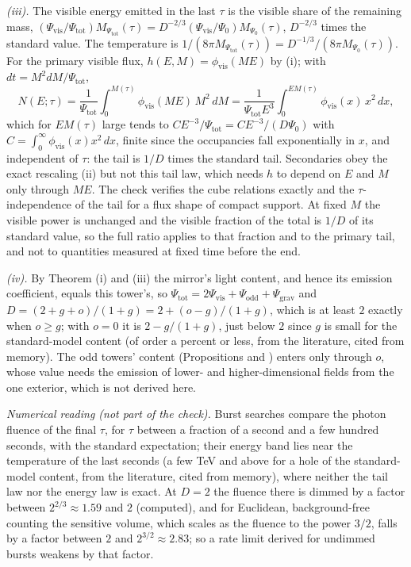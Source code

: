 \emph{(iii).} The visible energy emitted in the last $\tau$ is the visible share of the remaining mass, $(\Psi_{\mathrm{vis}}/\Psi_{\mathrm{tot}})M_{\Psi_{\mathrm{tot}}}(\tau) = D^{-2/3}(\Psi_{\mathrm{vis}}/\Psi_{0})M_{\Psi_{0}}(\tau)$, $D^{-2/3}$ times the standard value. The temperature is $1/(8\pi M_{\Psi_{\mathrm{tot}}}(\tau)) = D^{-1/3}/(8\pi M_{\Psi_{0}}(\tau))$. For the primary visible flux, $h(E, M) = \phi_{\mathrm{vis}}(ME)$ by (i); with $dt = M^{2}dM/\Psi_{\mathrm{tot}}$,
\[
N(E;\tau) = \frac{1}{\Psi_{\mathrm{tot}}}\int_{0}^{M(\tau)}\phi_{\mathrm{vis}}(ME)\,M^{2}\,dM = \frac{1}{\Psi_{\mathrm{tot}}E^{3}}\int_{0}^{EM(\tau)}\phi_{\mathrm{vis}}(x)\,x^{2}\,dx,
\]
which for $EM(\tau)$ large tends to $C E^{-3}/\Psi_{\mathrm{tot}} = C E^{-3}/(D\Psi_{0})$ with $C = \int_{0}^{\infty}\phi_{\mathrm{vis}}(x)x^{2}\,dx$, finite since the occupancies fall exponentially in $x$, and independent of $\tau$: the tail is $1/D$ times the standard tail. Secondaries obey the exact rescaling (ii) but not this tail law, which needs $h$ to depend on $E$ and $M$ only through $ME$. The check verifies the cube relations exactly and the $\tau$-independence of the tail for a flux shape of compact support. At fixed $M$ the visible power is unchanged and the visible fraction of the total is $1/D$ of its standard value, so the full ratio applies to that fraction and to the primary tail, and not to quantities measured at fixed time before the end.

\emph{(iv).} By Theorem (i) and (iii) the mirror's light content, and hence its emission coefficient, equals this tower's, so $\Psi_{\mathrm{tot}} = 2\Psi_{\mathrm{vis}} + \Psi_{\mathrm{odd}} + \Psi_{\mathrm{grav}}$ and $D = (2 + g + o)/(1 + g) = 2 + (o - g)/(1 + g)$, which is at least $2$ exactly when $o \ge g$; with $o = 0$ it is $2 - g/(1 + g)$, just below $2$ since $g$ is small for the standard-model content (of order a percent or less, from the literature, cited from memory). The odd towers' content (Propositions  and ) enters only through $o$, whose value needs the emission of lower- and higher-dimensional fields from the one exterior, which is not derived here.

\emph{Numerical reading (not part of the check).} Burst searches compare the photon fluence of the final $\tau$, for $\tau$ between a fraction of a second and a few hundred seconds, with the standard expectation; their energy band lies near the temperature of the last seconds (a few TeV and above for a hole of the standard-model content, from the literature, cited from memory), where neither the tail law nor the energy law is exact. At $D = 2$ the fluence there is dimmed by a factor between $2^{2/3} \approx 1.59$ and $2$ (computed), and for Euclidean, background-free counting the sensitive volume, which scales as the fluence to the power $3/2$, falls by a factor between $2$ and $2^{3/2} \approx 2.83$; so a rate limit derived for undimmed bursts weakens by that factor.
